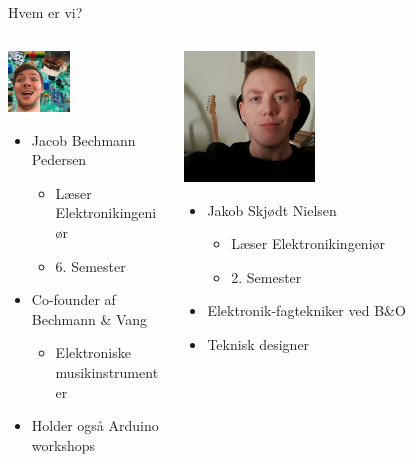 \documentclass{beamer}
\begin{document}
\begin{frame}{Hvem er vi?}
	\begin{columns}

		\begin{column}{0.5\textwidth}
		\begin{center}
			\includegraphics[width=0.4\textwidth]{assets/jacob_bp.png}
		\end{center}
		\begin{itemize}
		\item{Jacob Bechmann Pedersen}
			\begin{itemize}
			\item{Læser Elektronikingeniør}
			\item{6. Semester}
			\end{itemize}
		\item{Co-founder af Bechmann \& Vang}
			\begin{itemize}
			\item{Elektroniske musikinstrumenter}
			\end{itemize}
		\item{Holder også Arduino workshops}
		\end{itemize}
		\end{column}
		
		\begin{column}{0.5\textwidth}
		\begin{center}
			\includegraphics[width=0.4\textwidth]{assets/jakob_sn.jpg}
		\end{center}
		\begin{itemize}
		\item{Jakob Skjødt Nielsen}
			\begin{itemize}
			\item{Læser Elektronikingeniør}
			\item{2. Semester}
			\end{itemize}
		\item{Elektronik-fagtekniker ved B\&O}
		\item{Teknisk designer}
		\end{itemize}
		\end{column}
		

\end{columns}
\end{frame}
\end{document}
